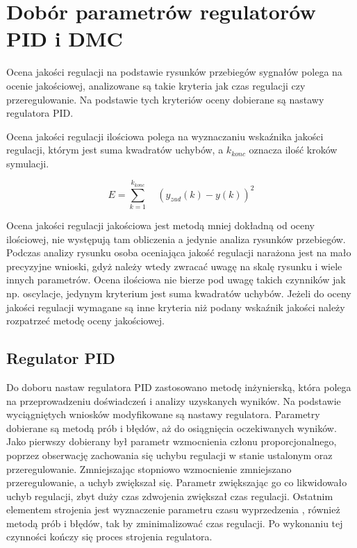 \section{Dobór parametrów regulatorów PID i DMC}
\label{projekt:zad4}

Ocena jakości regulacji na podstawie rysunków przebiegów sygnałów polega na ocenie jakościowej, 
analizowane są takie kryteria jak czas regulacji czy przeregulowanie. 
Na podstawie tych kryteriów oceny dobierane są nastawy regulatora PID.

Ocena jakości regulacji ilościowa polega na wyznaczaniu wskaźnika jakości regulacji, 
którym jest suma kwadratów uchybów, a $k_{konc}$ oznacza ilość kroków symulacji. 



$$
E=\sum_{k=1}^{k_{konc}} \quad (y_{zad}(k)-y(k))^{2}
$$

Ocena jakości regulacji jakościowa jest metodą mniej dokładną od oceny ilościowej, 
nie występują tam obliczenia a jedynie analiza rysunków przebiegów. 
Podczas analizy rysunku osoba oceniająca jakość regulacji narażona jest na mało precyzyjne wnioski, 
gdyż należy wtedy zwracać uwagę na skalę rysunku i wiele innych parametrów. 
Ocena ilościowa nie bierze pod uwagę takich czynników jak np. oscylacje, 
jedynym kryterium jest suma kwadratów uchybów. 
Jeżeli do oceny jakości regulacji wymagane są inne kryteria niż podany wskaźnik jakości 
należy rozpatrzeć metodę oceny jakościowej.

\subsection{Regulator PID}
\label{projekt:zad4:PID}

Do doboru nastaw regulatora PID zastosowano metodę inżynierską, 
która polega na przeprowadzeniu doświadczeń i analizy uzyskanych wyników. 
Na podstawie wyciągniętych wniosków modyfikowane są nastawy regulatora. 
Parametry  dobierane są metodą prób i błędów, aż do osiągnięcia oczekiwanych wyników. 
Jako pierwszy dobierany był parametr wzmocnienia członu proporcjonalnego, 
poprzez obserwację zachowania się uchybu regulacji w stanie ustalonym oraz przeregulowanie. 
Zmniejszając stopniowo wzmocnienie zmniejszano przeregulowanie, a uchyb zwiększał się. 
Parametr  zwiększając go co likwidowało uchyb regulacji,  
zbyt duży czas zdwojenia zwiększał czas regulacji. 
Ostatnim elementem strojenia jest wyznaczenie parametru czasu wyprzedzenia , 
również metodą prób i błędów, tak by zminimalizować czas regulacji. 
Po wykonaniu tej czynności kończy się proces strojenia regulatora.

